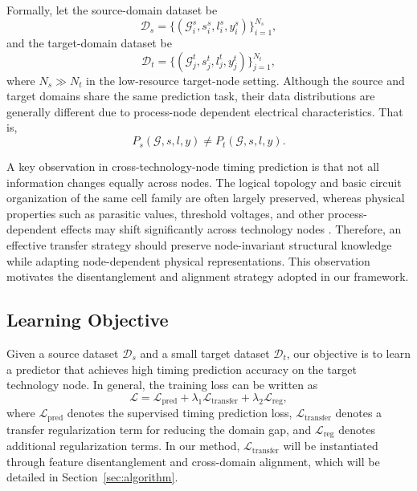 Formally, let the source-domain dataset be
\begin{equation}
    \mathcal{D}_s = \{(\mathcal{G}_i^s, s_i^s, l_i^s, y_i^s)\}_{i=1}^{N_s},
\end{equation}
and the target-domain dataset be
\begin{equation}
    \mathcal{D}_t = \{(\mathcal{G}_j^t, s_j^t, l_j^t, y_j^t)\}_{j=1}^{N_t},
\end{equation}
where $N_s \gg N_t$ in the low-resource target-node setting. Although the source and target domains share the same prediction task, their data distributions are generally different due to process-node dependent electrical characteristics. That is,
\begin{equation}
    P_s(\mathcal{G}, s, l, y) \neq P_t(\mathcal{G}, s, l, y).
\end{equation}

A key observation in cross-technology-node timing prediction is that not all information changes equally across nodes. The logical topology and basic circuit organization of the same cell family are often largely preserved, whereas physical properties such as parasitic values, threshold voltages, and other process-dependent effects may shift significantly across technology nodes \cite{zhang2024disentangle,tang2025knowledge}. Therefore, an effective transfer strategy should preserve node-invariant structural knowledge while adapting node-dependent physical representations. This observation motivates the disentanglement and alignment strategy adopted in our framework.

\subsection{Learning Objective}

Given a source dataset $\mathcal{D}_s$ and a small target dataset $\mathcal{D}_t$, our objective is to learn a predictor that achieves high timing prediction accuracy on the target technology node. In general, the training loss can be written as
\begin{equation}
    \mathcal{L} = \mathcal{L}_{\mathrm{pred}} + \lambda_1 \mathcal{L}_{\mathrm{transfer}} + \lambda_2 \mathcal{L}_{\mathrm{reg}},
\end{equation}
where $\mathcal{L}_{\mathrm{pred}}$ denotes the supervised timing prediction loss, $\mathcal{L}_{\mathrm{transfer}}$ denotes a transfer regularization term for reducing the domain gap, and $\mathcal{L}_{\mathrm{reg}}$ denotes additional regularization terms. In our method, $\mathcal{L}_{\mathrm{transfer}}$ will be instantiated through feature disentanglement and cross-domain alignment, which will be detailed in Section~\ref{sec:algorithm}.
